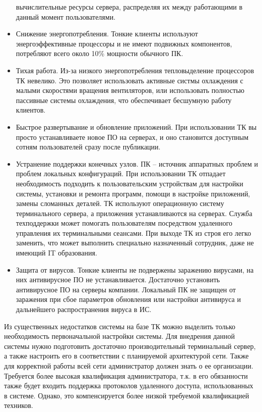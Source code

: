 \begin{itemize}
        вычислительные ресурсы сервера, распределяя их между работающими в данный момент
        пользователями.
    \item   Снижение энергопотребления. Тонкие клиенты используют
        энергоэффективные процессоры и не имеют подвижных компонентов, потребляют всего
        около 10\% мощности обычного ПК.
    \item   Тихая работа. Из-за низкого энергопотребления тепловыделение процессоров ТК
        невелико. Это позволяет использовать активные систмы охлаждения с малыми
        скоростями вращения вентиляторов, или использовать полностью пассивные системы
        охлаждения, что обеспечивает бесшумную работу клиентов.
    \item   Быстрое развертывание и обновление приложений. При использовании ТК вы
        просто устанавливаете новое ПО на серверах, и оно становится доступным сотням
        пользователей сразу после публикации.
    \item   Устранение поддержки конечных узлов. ПК – источник аппаратных проблем и
        проблем локальных конфигураций. При использовании ТК отпадает необходимость
        подходить к пользовательским устройствам для настройки системы, установки и
        ремонта программ, помощи в настройке приложений, замены сломанных деталей. ТК
        используют операционную систему терминального сервера, а приложения
        устанавливаются на серверах. Служба техподдержки может помогать пользователям
        посредством удаленного управления их терминальными сеансами. При выходе ТК из
        строя его легко заменить, что может выполнить специально назначенный сотрудник,
        даже не имеющий IT образования.
    \item   Защита от вирусов. Тонкие клиенты не подвержены заражению вирусами, на них
        антивирусное ПО не устанавливается. Достаточно установить антивирусное ПО на
        серверы компании. Локальный ПК не защищен от заражения при сбое параметров
        обновления или настройки антивируса и дальнейшего распространения вируса в ИС.
\end{itemize}

Из существенных недостатков системы на базе ТК можно выделить только необходимость
первоначальной настройки системы. Для внедрения данной системы нужно подготовить
достаточно производительный терминальный сервер, а также настроить его в соответствии с
планируемой архитектурой сети.  Также для корректной работы всей сети администратор
должен знать о ее организации.  Требуется более высокая квалификация администратора,
т.к. в его обязанности также будет входить поддержка протоколов удаленного доступа,
использованных в системе.  Однако, это компенсируется более низкой требуемой
квалификацией техников.
